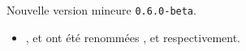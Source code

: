 Nouvelle version mineure \verb+0.6.0-beta+.

\begin{itemize}[itemsep=.5em]
    \item {}
          ,
          et
          ont été renommées
          ,
          et
          respectivement.


\end{itemize}

\separation


